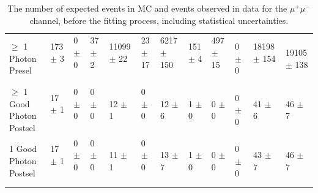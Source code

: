 \begin{table}
{\begin{tabular}{|l|l|l|l|l|l|l|l|l|l|l|l|}
$\geq$ 1 Photon Presel & 173 $\pm$ 3 \ & 0 $\pm$ 0 \ & 37 $\pm$ 2 \ & 11099 $\pm$ 22 \ & 23 $\pm$ 17 \ & 6217 $\pm$ 150 \ & 151 $\pm$ 4 \ & 497 $\pm$ 15 \ & 0 $\pm$ 0\ & 18198 $\pm$ 154 \ & 19105 $\pm$ 138 \\
$\geq$ 1 Good Photon Postsel & 17 $\pm$ 1 \ & 0 $\pm$ 0 \ & 0 $\pm$ 0 \ & 12 $\pm$ 1 \ & 0 $\pm$ 0 \ & 12 $\pm$ 6 \ & 1 $\pm$ 0 \ & 0 $\pm$ 0 \ & 0 $\pm$ 0\ & 41 $\pm$ 6 \ & 46 $\pm$ 7 \\
1 Good Photon Postsel & 17 $\pm$ 1 \ & 0 $\pm$ 0 \ & 0 $\pm$ 0 \ & 11 $\pm$ 1 \ & 0 $\pm$ 0 \ & 13 $\pm$ 7 \ & 1 $\pm$ 0 \ & 0 $\pm$ 0 \ & 0 $\pm$ 0\ & 43 $\pm$ 7 \ & 46 $\pm$ 7 \\

\hline
\end{tabular}
}
\caption{The number of expected events in MC and events observed in data for the $\mu^+\mu^-$ channel, before the fitting process, including statistical uncertainties.}
\end{table}

